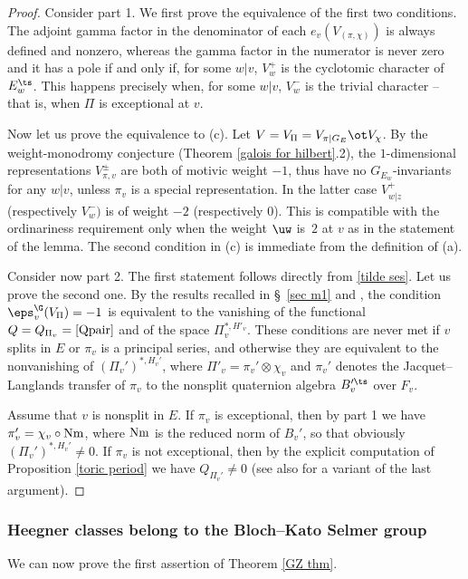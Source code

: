 \begin{proof} Consider part 1. We first prove the equivalence of the first two conditions. The adjoint gamma factor in the denominator of each $e_{v}(V_{(\pi, \chi)})$ is always defined and nonzero, whereas the gamma factor in the numerator is never zero and it has a pole if and only if, for some $w\vert v$, $V_{w}^{+}$  is the cyclotomic character of $E_{w}^{\ts}$. This happens precisely when, for some $w\vert v$,  $V_{w}^{-}$ is the trivial character -- that is, when $\Pi$ is exceptional at $v$.

Now let us prove the equivalence to (c). Let $V=V_{\Pi}=V_{\pi|G_{E}}\ot V_{\chi}$. By the weight-monodromy conjecture (Theorem \ref{galois for hilbert}.2), the $1$-dimensional representations  $V^{\pm}_{\pi,v}$ are both  of motivic weight $-1$, thus have no $G_{E_{w}}$-invariants for any $w\vert v$,  unless $\pi_{ v}$ is a special representation.  In the latter case $V^{+}_{w|z}$ (respectively $V_{w}^{-})$ is of weight $-2$ (respectively $0$).
This is compatible with the ordinariness requirement only when the weight $\uw$ is~$2$ at $v$ as in the statement of the lemma.  The second condition in (c) is immediate from the definition of (a).

Consider now part 2. The first statement follows directly from  \eqref{tilde ses}. Let us prove the second one. By the results recalled in \S~\ref{sec m1} and \cite[Lemme 10]{wald}, the  condition $ \eps_{v}^{\G}(V_{\Pi}) = -1$ is equivalent to the vanishing of  the functional $Q=Q_{\Pi_{v}}=\eqref{Qpair}$ and of the space $\Pi_{v}^{*, H'_{v}}$. These conditions are never met if $v$ splits in $E$ or $\pi_{v}$ is a principal series, and otherwise they are equivalent  to the nonvanishing of $(\Pi_{v}')^{*, H_{v}'}$, where $\Pi'_{v}=\pi_{v}'\otimes \chi_{v}$ and $\pi_{v}'$ denotes the Jacquet--Langlands transfer of $\pi_{v}$ to the nonsplit quaternion algebra $B_{v}'^{\ts}$ over $F_{v}$.

Assume that $v$ is nonsplit in $E$. If $\pi_{v}$ is exceptional, then by part 1 we have $\pi_{v}' =  \chi_{v}\circ {\rm Nm}$, where ${\rm Nm} $ is the reduced norm of $B_{v}'$, so that obviously $(\Pi_{v}')^{*, H_{v}'}\neq 0$. If $\pi_{v}$ is not exceptional, then by the explicit computation of Proposition \ref{toric period} we have $Q_{\Pi_{v}'}\neq 0$ (see also \cite[Corollary A.2.3]{nonsplit} for a variant of the last argument).
\end{proof}



\subsubsection{Heegner classes belong to the Bloch--Kato Selmer group}
 We can now prove the first assertion of Theorem \ref{GZ thm}.

